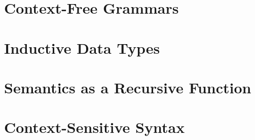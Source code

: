 \section{Context-Free Grammars}

\section{Inductive Data Types}

\section{Semantics as a Recursive Function}

\section{Context-Sensitive Syntax}

